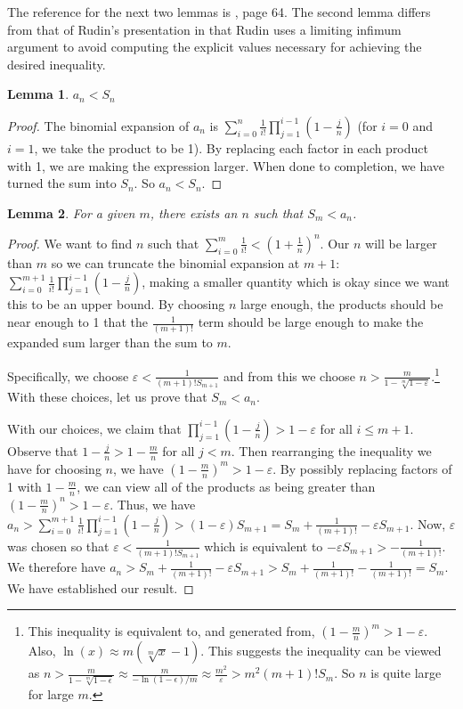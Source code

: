 \documentclass[12pt]{article}
\newtheorem{lemma}{Lemma}
\theoremstyle{remark}
\begin{document}
The reference for the next two lemmas is \cite{rudin}, page 64. The second lemma differs from that of Rudin's presentation in that Rudin uses a limiting infimum argument to avoid computing the explicit values necessary for achieving the desired inequality. 

\begin{lemma}\label{lem:ansn}
$a_n < S_n$
\end{lemma}

\begin{proof}
The binomial expansion of $a_n$ is $\sum_{i=0}^n \frac{1}{i!} \prod_{j=1}^{i-1} (1-\tfrac{j}{n})$ (for $i=0$ and $i=1$, we take the product to be 1). By replacing each factor in each product with 1, we are making the expression larger. When done to completion, we have turned the sum into $S_n$. So $a_n < S_n$.
\end{proof}

\begin{lemma}\label{lem:snam}
For a given $m$, there exists an $n$ such that $S_m < a_n$.   
\end{lemma}

\begin{proof}
 We want to find $n$ such that $\sum_{i=0}^m \frac{1}{i!} < (1+\frac{1}{n})^n$. Our $n$ will be larger than $m$ so we can truncate the binomial expansion at $m+1$: $\sum_{i=0}^{m+1} \frac{1}{i!} \prod_{j=1}^{i-1} (1-\tfrac{j}{n})$, making a smaller quantity which is okay since we want this to be an upper bound. By choosing $n$ large enough, the products should be near enough to 1 that the $\frac{1}{(m+1)!}$ term should be large enough to make the expanded sum larger than the sum to $m$. 

 Specifically, we choose $\varepsilon < \frac{1}{(m+1)! S_{m+1}  }$ and from this we choose $n > \frac{m}{ 1 - \sqrt[m]{1-\varepsilon}}$.\footnote{This inequality is equivalent to, and generated from, $(1-\tfrac{m}{n})^m > 1 - \varepsilon$. Also, $\ln(x) \approx m (\sqrt[m]{x} -1)$. This suggests the inequality can be viewed as $n > \frac{m}{1 - \sqrt[m]{1-\epsilon}} \approx \frac{m}{-\ln(1 - \epsilon)/m} \approx \frac{m^2}{\varepsilon} > m^2 (m+1)! S_m$. So $n$ is quite large for large $m$.} With these choices, let us prove that $S_m < a_n$. 
 
 With our choices, we claim that $\prod_{j=1}^{i-1} (1-\tfrac{j}{n}) > 1-\varepsilon$ for all $i \leq m+1$. Observe that $1-\tfrac{j}{n} > 1 -\tfrac{m}{n}$ for all $j < m$. Then rearranging the inequality we have for choosing $n$, we have $(1 - \tfrac{m}{n})^m > 1 - \varepsilon $. By possibly replacing factors of 1 with $1-\tfrac{m}{n}$, we can view all of the products as being greater than $(1 - \tfrac{m}{n})^n > 1-\varepsilon$.  Thus, we have 
 $a_n >  \sum_{i=0}^{m+1} \frac{1}{i!} \prod_{j=1}^{i-1} (1-\tfrac{j}{n}) > (1-\varepsilon) S_{m+1} = S_m + \frac{1}{(m+1)!} - \varepsilon S_{m+1}$.  Now, $\varepsilon$ was chosen so that $\varepsilon < \frac{1}{(m+1)! S_{m+1}}$ which is equivalent to $- \varepsilon S_{m+1} > -\frac{1}{(m+1)!}$. We therefore have $a_n > S_m + \frac{1}{(m+1)!} - \varepsilon S_{m+1} > S_m + \frac{1}{(m+1)!} - \frac{1}{(m+1)!} = S_m$. We have established our result. 
\end{proof}
\end{document}
